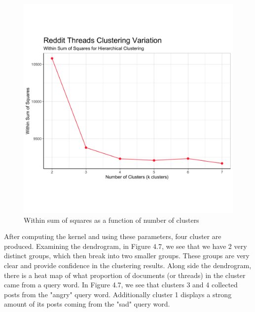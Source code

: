 \begin{figure}
\includegraphics[width=6in]{Content/Images/reddit_wss.png}
\caption{Within sum of squares as a function of number of clusters}
\end{figure}

After computing the kernel and using these parameters, four cluster are produced. Examining the dendrogram, in Figure 4.7, we see that we have 2 very distinct groups, which then break into two smaller groups. These groups are very clear and provide confidence in the clustering results. Along side the dendrogram, there is a heat map of what proportion of documents (or threads) in the cluster came from a query word. In Figure 4.7, we see that clusters 3 and 4 collected posts from the "angry" query word. Additionally cluster 1 displays a strong amount of its posts coming from the "sad" query word. \\

